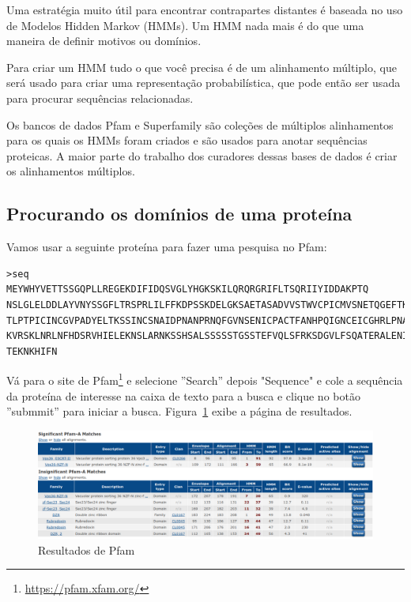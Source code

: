 \documentclass[letter,11pt]{book}
\begin{document}
Uma estratégia muito útil para encontrar contrapartes distantes é baseada no uso de Modelos Hidden Markov (HMMs). Um HMM nada mais é do que uma maneira de definir motivos ou domínios.

Para criar um HMM tudo o que você precisa é de um alinhamento múltiplo, que será usado para criar uma representação probabilística, que pode então ser usada para procurar sequências relacionadas.

Os bancos de dados Pfam \citep{Finn2010} e {\sc Superfamily} \citep{Wilson2009} são coleções de múltiplos alinhamentos para os quais os HMMs foram criados e são usados para anotar sequências proteicas. A maior parte do trabalho dos curadores dessas bases de dados é criar os alinhamentos múltiplos.

\subsection{Procurando os domínios de uma proteína}

Vamos usar a seguinte proteína para fazer uma pesquisa no Pfam:

\begin{Verbatim}[commandchars=!\{\},label=proteína desconhecida,frame=topline,fontsize=\scriptsize]
>seq
MEYWHYVETTSSGQPLLREGEKDIFIDQSVGLYHGKSKILQRQRGRIFLTSQRIIYIDDAKPTQ
NSLGLELDDLAYVNYSSGFLTRSPRLILFFKDPSSKDELGKSAETASADVVSTWVCPICMVSNETQGEFTKD
TLPTPICINCGVPADYELTKSSINCSNAIDPNANPRNQFGVNSENICPACTFANHPQIGNCEICGHRLPNAS
KVRSKLNRLNFHDSRVHIELEKNSLARNKSSHSALSSSSSTGSSTEFVQLSFRKSDGVLFSQATERALENIL 
TEKNKHIFN
\end{Verbatim} 

Vá para o site de Pfam\footnote{\url{https://pfam.xfam.org/}} e selecione ''Search'' depois "Sequence"  e cole a sequência da proteína de interesse na caixa de texto para a busca e clique no botão ''submmit'' para iniciar a busca. Figura~\ref{PfamResults} exibe a página de resultados.

\begin{figure}[h!]
\centering
 \includegraphics[width=14cm]{Figs/PfamResults.png}
 \caption{\label{PfamResults}Resultados de Pfam}
\end{figure}
\end{document}
